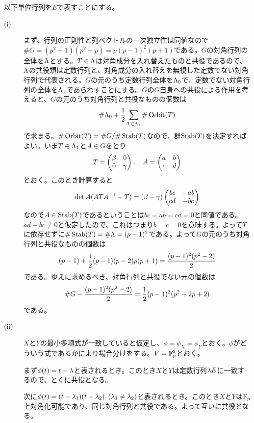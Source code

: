 \begin{sol} 以下単位行列を$E$で表すことにする。
  \begin{description}
    \item[(i)] まず、行列の正則性と列ベクトルの一次独立性は同値なので$\# G= (p^2-1)(p^2 - p) = p(p-1)^2(p+1)$である。$G$の対角行列の全体を${\Lambda}$とする。$T \in {\Lambda}$は対角成分を入れ替えたものと共役であるので、${\Lambda}$の共役類は定数行列と、対角成分の入れ替えを無視した定数でない対角行列で代表される。$G$の元のうち定数行列全体を${\Lambda}_0$で、定数でない対角行列の全体を${\Lambda}_1$であらわすことにする。$G$の$G$自身への共役による作用を考えると、$G$の元のうち対角行列と共役なものの個数は
    \[
    \# {\Lambda}_0 + \frac{1}{2} \sum_{T \in {\Lambda}_1} \# \operatorname{Orbit} (T)
    \]
    で求まる。$\# \operatorname{Orbit} (T) = \# G / \# \operatorname{Stab} (T)$なので、群$\operatorname{Stab} (T)$を決定すればよい。いま$T \in {\Lambda}_1$と$A \in G$をとり
    \[
    T = \begin{pmatrix}  \beta & 0 \\ 0 & {\gamma} \end{pmatrix}, \quad A = \begin{pmatrix} a & b\\ c & d \end{pmatrix}
    \]
    とおく。このとき計算すると
    \[
    \det A ( ATA^{-1} - T) = (\beta - {\gamma}) \begin{pmatrix} bc & -ab \\ cd & -bc \end{pmatrix}
    \]
    なので$A \in \operatorname{Stab} (T)$であるということは$bc = ab = cd = 0$と同値である。$ad-bc \neq 0$と仮定したので、これはつまり$b=c=0$を意味する。よって$T$に依存せずに$\# \operatorname{Stab}(T) =\# {\Lambda}= (p-1)^2$である。よって$G$の元のうち対角行列と共役なものの個数は
    \[
    (p-1) + \frac{1}{2} (p-1)(p-2) p(p+1) = \frac{(p-1)^2 (p^2 -2)}{2}
    \]
    である。ゆえに求めるべき、対角行列と共役でない元の個数は
    \[
    \# G - \frac{(p-1)^2 (p^2 -2)}{2} = \frac{1}{2} (p-1)^2 (p^2 + 2p +2)
    \]
    である。
    \item[(ii)] $X$と$Y$の最小多項式が一致していると仮定し、$\phi = \phi_X = \phi_Y$とおく。$\phi$がどういう式であるかにより場合分けをする。$V = {\mathbb F}_p^2$とおく。

    まず$\phi(t) = t - {\lambda}$と表されるとき。このとき$X$と$Y$は定数行列${\lambda} E$に一致するので、とくに共役となる。

    次に$\phi(t) = (t- {\lambda}_1)(t-{\lambda}_2)$ $({\lambda}_1 \neq {\lambda}_2)$と表されるとき。このとき$X$と$Y$は${\mathbb F}_p$上対角化可能であり、同じ対角行列と共役である。よって互いに共役となる。


\end{description}
\end{sol}
